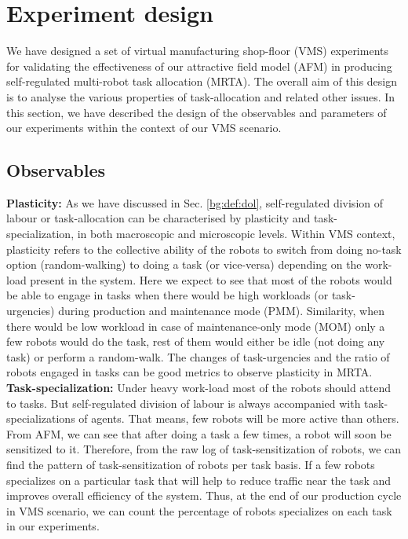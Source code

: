 \section{Experiment design}
\label{afm:expt-design}
We have designed a set of virtual manufacturing shop-floor (VMS) experiments for validating the effectiveness of our attractive field model (AFM)  in producing self-regulated multi-robot task allocation (MRTA).  The overall aim of this design is to analyse the various properties of task-allocation and related other issues. In this section, we have described the design of the observables and parameters of our experiments within the context of our VMS scenario. 
\subsection{Observables}
\textbf{Plasticity:} As we have discussed in Sec. \ref{bg:def:dol},  self-regulated division of labour or task-allocation can be characterised by plasticity and task-specialization, in both macroscopic and microscopic levels. Within VMS context, plasticity refers to the collective ability of the robots to switch from doing no-task option (random-walking) to doing a task (or vice-versa) depending on the work-load present in the system. Here we expect to see that most of the robots would be able to engage in tasks when there would be high workloads (or task-urgencies) during production and maintenance mode (PMM). Similarity, when there would be low workload in case of maintenance-only mode (MOM) only a few robots would do the task, rest of them would either be idle (not doing any task) or perform a random-walk.  The changes of task-urgencies and the ratio of robots engaged in tasks can be good metrics to observe plasticity in MRTA.\\
\textbf{Task-specialization:} Under heavy work-load most of the robots should attend to tasks. But self-regulated division of labour is always accompanied with task-specializations of agents. That means, few robots will be more active than others. From AFM, we can see that after doing a task a few times, a robot will soon be sensitized to it. Therefore, from the raw log of task-sensitization of robots, we can find the pattern of task-sensitization of robots per task basis. If a few robots specializes on a particular task that will help to reduce traffic near the task and improves overall efficiency of the system. Thus, at the end of our production cycle in VMS scenario, we can count the percentage of robots specializes on each task in our experiments.\\
